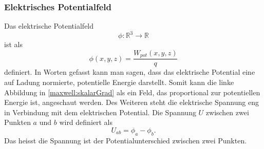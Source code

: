 \subsubsection{Elektrisches Potentialfeld}
Das elektrische Potentialfeld
\[
\phi:\mathbb{R}^3
\rightarrow
\mathbb{R}
\]
ist als
\begin{equation}
	\phi(x,y,z)
	=
	\frac{W_{pot}(x,y,z)}{q}
	\label{maxwell:section:definition_elektrischespotentialfeld}
\end{equation}
definiert.
In Worten gefasst kann man sagen, dass das elektrische Potential eine auf Ladung normierte, potentielle Energie darstellt.
Somit kann die linke Abbildung in \ref{maxwell:skalarGrad} als ein Feld, das proportional zur potentiellen Energie ist, angeschaut werden.
Des Weiteren steht die elektrische Spannung eng in Verbindung mit dem elektrischen Potential.
Die Spannung $U$ zwischen zwei Punkten $a$ und $b$ wird definiert als
\[
U_{ab}
=
\phi_a - \phi_b.
\]
Das heisst die Spannung ist der Potentialunterschied zwischen zwei Punkten.

